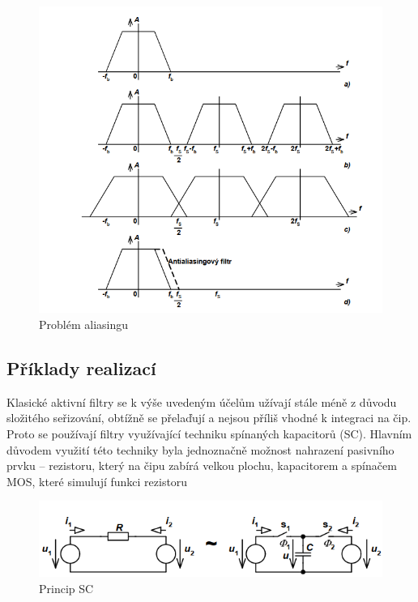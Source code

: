    \begin{figure}[h]
   \begin{center}
     \includegraphics[scale=0.6]{images/Aliasing.png}
   \end{center}
   \caption{Problém aliasingu}
   \label{fig:ali}
  \end{figure}
\pagebreak  
\subsection{Příklady realizací}
Klasické aktivní filtry se k výše uvedeným účelům užívají stále méně z důvodu složitého seřizování, obtížně se přelaďují a nejsou příliš vhodné k integraci na čip. Proto se používají filtry využívající techniku spínaných kapacitorů (SC). Hlavním důvodem využití této techniky byla jednoznačně možnost nahrazení pasivního prvku – rezistoru, který na čipu zabírá velkou plochu, kapacitorem a spínačem MOS, které simulují funkci rezistoru
   \begin{figure}[h]
   \begin{center}
     \includegraphics[scale=0.6]{images/SC.png}
   \end{center}
   \caption{Princip SC}
  \end{figure}
  

